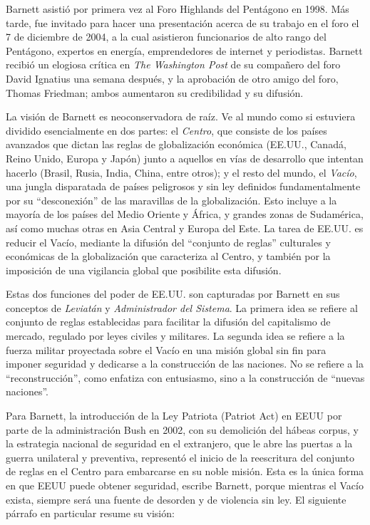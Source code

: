 \documentclass[10pt,a5paper,twoside,spanish,]{book}
\begin{document}
Barnett asistió por primera vez al Foro Highlands del Pentágono en 1998.
Más tarde, fue invitado para hacer una presentación acerca de su trabajo
en el foro el 7 de diciembre de 2004, a la cual asistieron funcionarios
de alto rango del Pentágono, expertos en energía, emprendedores de
internet y periodistas. Barnett recibió un elogiosa crítica en \emph{The
Washington Post} de su compañero del foro David Ignatius una semana
después, y la aprobación de otro amigo del foro, Thomas Friedman; ambos
aumentaron su credibilidad y su difusión.

La visión de Barnett es neoconservadora de raíz. Ve al mundo como si
estuviera dividido esencialmente en dos partes: el \emph{Centro}, que
consiste de los países avanzados que dictan las reglas de globalización
económica (EE.UU., Canadá, Reino Unido, Europa y Japón) junto a aquellos
en vías de desarrollo que intentan hacerlo (Brasil, Rusia, India, China,
entre otros); y el resto del mundo, el \emph{Vacío}, una jungla
disparatada de países peligrosos y sin ley definidos fundamentalmente
por su ``desconexión'' de las maravillas de la globalización. Esto
incluye a la mayoría de los países del Medio Oriente y África, y grandes
zonas de Sudamérica, así como muchas otras en Asia Central y Europa del
Este. La tarea de EE.UU. es reducir el Vacío, mediante la difusión del
``conjunto de reglas'' culturales y económicas de la globalización que
caracteriza al Centro, y también por la imposición de una vigilancia
global que posibilite esta difusión.

Estas dos funciones del poder de EE.UU. son capturadas por Barnett en
sus conceptos de \emph{Leviatán} y \emph{Administrador del Sistema}. La
primera idea se refiere al conjunto de reglas establecidas para
facilitar la difusión del capitalismo de mercado, regulado por leyes
civiles y militares. La segunda idea se refiere a la fuerza militar
proyectada sobre el Vacío en una misión global sin fin para imponer
seguridad y dedicarse a la construcción de las naciones. No se refiere a
la ``reconstrucción'', como enfatiza con entusiasmo, sino a la
construcción de ``nuevas naciones''.

Para Barnett, la introducción de la Ley Patriota (Patriot Act) en EEUU
por parte de la administración Bush en 2002, con su demolición del
hábeas corpus, y la estrategia nacional de seguridad en el extranjero,
que le abre las puertas a la guerra unilateral y preventiva, representó
el inicio de la reescritura del conjunto de reglas en el Centro para
embarcarse en su noble misión. Esta es la única forma en que EEUU puede
obtener seguridad, escribe Barnett, porque mientras el Vacío exista,
siempre será una fuente de desorden y de violencia sin ley. El siguiente
párrafo en particular resume su visión:
\end{document}
